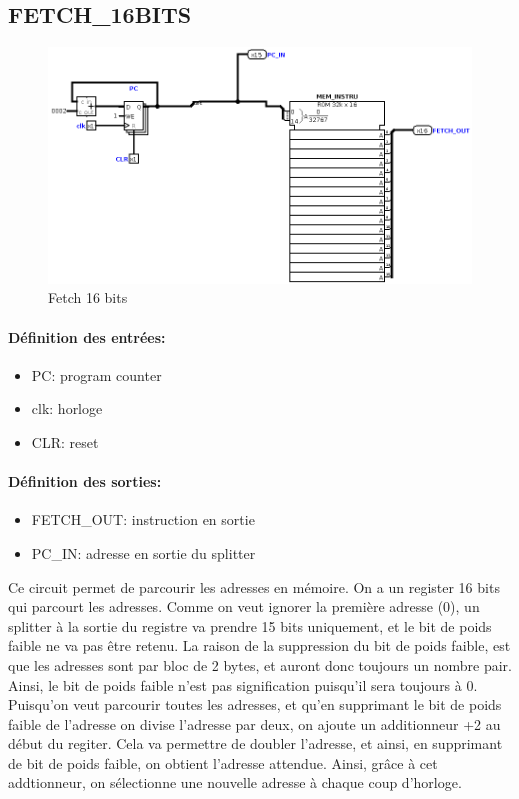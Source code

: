 \documentclass[a4paper]{article} %
\begin{document}
\subsection{FETCH\_16BITS}
\begin{figure}[H]
    \centering
    \includegraphics[width=1\textwidth]{src/FETCH.png}
    \caption{Fetch 16 bits}
    \label{fetch_16bits}
\end{figure}
\paragraph{Définition des entrées:}
\begin{itemize}
    \item     PC: program counter
    \item     clk: horloge
    \item     CLR: reset
\end{itemize}

\paragraph{Définition des sorties:}
\begin{itemize}
    \item FETCH\_OUT: instruction en sortie
    \item     PC\_IN: adresse en sortie du splitter
\end{itemize}
\medskip
Ce circuit permet de parcourir les adresses en mémoire. On a un register 16 bits qui parcourt les adresses. Comme on veut ignorer la première adresse (0), un splitter à la sortie du registre va prendre 15 bits uniquement, et le bit de poids faible ne va pas être retenu. La raison de la suppression du bit de poids faible, est que les adresses sont par bloc de 2 bytes, et auront donc toujours un nombre pair. Ainsi, le bit de poids faible n'est pas signification puisqu'il sera toujours à 0. Puisqu'on veut parcourir toutes les adresses, et qu'en supprimant le bit de poids faible de l'adresse on divise l'adresse par deux, on ajoute un additionneur +2 au début du regiter. Cela va permettre de doubler l'adresse, et ainsi, en supprimant de bit de poids faible, on obtient l'adresse attendue. Ainsi, grâce à cet addtionneur, on sélectionne une nouvelle adresse à chaque coup d'horloge.
\end{document}
